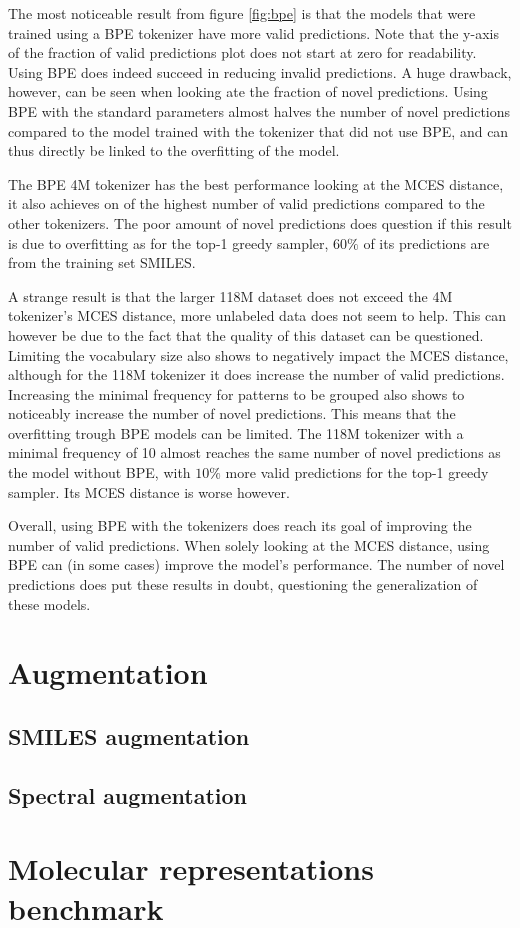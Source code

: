 The most noticeable result from figure \ref{fig:bpe} is that the models that were trained using a BPE tokenizer have more valid predictions.
Note that the y-axis of the fraction of valid predictions plot does not start at zero for readability.
Using \ac{BPE} does indeed succeed in reducing invalid predictions.
A huge drawback, however, can be seen when looking ate the fraction of novel predictions.
Using \ac{BPE} with the standard parameters almost halves the number of novel predictions compared to the model trained with the tokenizer that did not use \ac{BPE},
and can thus directly be linked to the overfitting of the model.

The \ac{BPE} 4M tokenizer has the best performance looking at the MCES distance, it also achieves on of the highest number of valid predictions compared to the other tokenizers.
The poor amount of novel predictions does question if this result is due to overfitting as for the top-1 greedy sampler, $60\%$ of its predictions are from the training set SMILES.

A strange result is that the larger 118M dataset does not exceed the 4M tokenizer's MCES distance, more unlabeled data does not seem to help.
This can however be due to the fact that the quality of this dataset can be questioned.
Limiting the vocabulary size also shows to negatively impact the MCES distance, although for the 118M tokenizer it does increase the number of valid predictions.
Increasing the minimal frequency for patterns to be grouped also shows to noticeably increase the number of novel predictions.
This means that the overfitting trough \ac{BPE} models can be limited.
The 118M tokenizer with a minimal frequency of 10 almost reaches the same number of novel predictions as the model without \ac{BPE}, with $10\%$ more valid predictions for the top-1 greedy sampler.
Its MCES distance is worse however.

Overall, using \ac{BPE} with the tokenizers does reach its goal of improving the number of valid predictions.
When solely looking at the MCES distance, using \ac{BPE} can (in some cases) improve the model's performance.
The number of novel predictions does put these results in doubt, questioning the generalization of these models.

\section{Augmentation}

\subsection{SMILES augmentation}

\subsection{Spectral augmentation}


\section{Molecular representations benchmark}